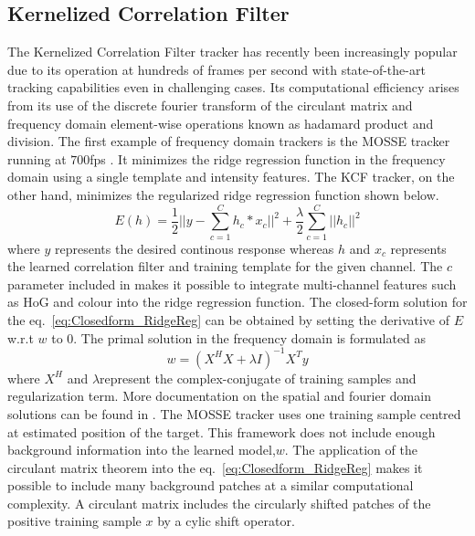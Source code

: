 \documentclass{bmvc2k}
\begin{document}
\subsection{Kernelized Correlation Filter} \label{sec:kcf}
The Kernelized Correlation Filter tracker has recently been
increasingly popular due to its operation at hundreds of frames per
second with state-of-the-art tracking capabilities even in challenging
cases. Its computational efficiency arises from its use of the
discrete fourier transform of the circulant matrix and frequency
domain element-wise operations known as hadamard product and
division. The first example of frequency domain trackers is the MOSSE
tracker running at $700$fps \cite{bolme2010visual}. It minimizes the
ridge regression function in the frequency domain using a single
template and intensity features. The KCF tracker, on the other hand,
minimizes the regularized ridge regression function shown below.
\begin{equation}
E(h) = \frac{1}{2}||y-\sum_{c=1}^{C}h_{c}*x_{c}||^{2} + \frac{\lambda}{2}\sum_{c=1}^{C}||h_{c}||^{2}
\label{eq:Closedform_RidgeReg}
\end{equation}
where $y$ represents the desired continous response whereas $h$ and
$x_{c}$ represents the learned correlation filter and training
template for the given channel. The $c$ parameter included in
\cite{henriques2015high,galoogahi2013multi} makes it possible to
integrate multi-channel features such as HoG and colour into the ridge
regression function. The closed-form solution for the
eq.~\ref{eq:Closedform_RidgeReg} can be obtained by setting the
derivative of $E$ w.r.t $w$ to $0$. The primal solution in the
frequency domain is formulated as
\begin{equation}
w = (X^{H}X+\lambda I)^{-1}X^{T}y
\label{eq:FourierSolution}
\end{equation}
where $X^{H}$ and $\lambda$represent the complex-conjugate of training
samples and regularization term. More documentation on the spatial and
fourier domain solutions can be found in \cite{henriques2015high}. The
MOSSE tracker uses one training sample centred at estimated position
of the target. This framework does not include enough background
information into the learned model,$w$. The application of the
circulant matrix theorem into the eq.~\ref{eq:Closedform_RidgeReg}
makes it possible to include many background patches at a similar
computational complexity. A circulant matrix includes the circularly
shifted patches of the positive training sample $x$ by a cylic shift
operator.
\end{document}
